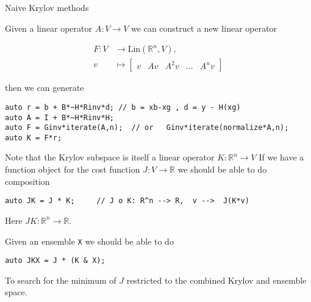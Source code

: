 \documentclass[9pt]{beamer}
\newcommand\Lin{\mathrm{Lin}}   %
\begin{document}
\begin{frame}[fragile] {Naive Krylov methods}


Given a linear operator $A: V \rightarrow V$ we can construct a new linear operator


\begin{align*}
 F : V &\rightarrow \Lin(\mathbb{R}^n,V),  \\
                      v &\mapsto   \begin{bmatrix}  v & Av & A^2v & \ldots  & A^nv\end{bmatrix}
\end{align*}

then we can generate
\begin{lstlisting}
auto r = b + B*~H*Rinv*d; // b = xb-xg , d = y - H(xg)
auto A = I + B*~H*Rinv*H;
auto F = Ginv*iterate(A,n);  // or   Ginv*iterate(normalize*A,n);
auto K = F*r;
\end{lstlisting}




\pause
Note that the Krylov subspace is itself a linear operator $K: \mathbb{R}^n \rightarrow V$
If we have a function object for the cost function $J: V \rightarrow \mathbb{R}$ we should be able to do composition
\begin{lstlisting}
auto JK = J * K;     // J o K: R^n --> R,  v -->  J(K*v)
\end{lstlisting}

Here $JK: \mathbb{R}^n \rightarrow  \mathbb{R}$.

Given an ensemble \lstinline|X| we should be able to do

\begin{lstlisting}
auto JKX = J * (K & X);
\end{lstlisting}

To search for the minimum of $J$ restricted to the combined Krylov and ensemble space.


\end{frame}
\end{document}
